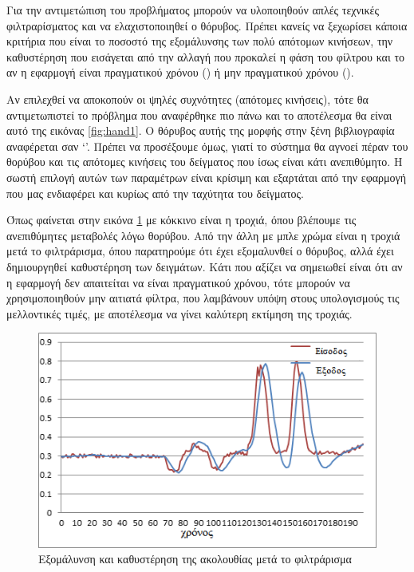 Για την αντιμετώπιση του προβλήματος μπορούν να υλοποιηθούν απλές τεχνικές φιλτραρίσματος και να ελαχιστοποιηθεί ο θόρυβος. Πρέπει κανείς να ξεχωρίσει κάποια κριτήρια που είναι το ποσοστό της εξομάλυνσης των πολύ απότομων κινήσεων, την καθυστέρηση που εισάγεται από την αλλαγή που προκαλεί η φάση του φίλτρου και το αν η εφαρμογή είναι πραγματικού χρόνου () ή μην πραγματικού χρόνου ().

Αν επιλεχθεί να αποκοπούν οι ψηλές συχνότητες (απότομες κινήσεις), τότε θα αντιμετωπιστεί το πρόβλημα που αναφέρθηκε πιο πάνω και το αποτέλεσμα θα είναι αυτό της εικόνας \ref{fig:hand1}. Ο θόρυβος αυτής της μορφής στην ξένη βιβλιογραφία αναφέρεται σαν \lq {}\rq . Πρέπει να προσέξουμε όμως, γιατί το σύστημα θα αγνοεί πέραν του θορύβου και τις απότομες κινήσεις του δείγματος που ίσως είναι κάτι ανεπιθύμητο. Η σωστή επιλογή αυτών των παραμέτρων είναι κρίσιμη και εξαρτάται από την εφαρμογή που μας ενδιαφέρει και κυρίως από την ταχύτητα του δείγματος.

Όπως φαίνεται στην εικόνα \ref{fig:filter-latency} με κόκκινο είναι η τροχιά, όπου βλέπουμε τις ανεπιθύμητες μεταβολές λόγω θορύβου. Από την άλλη με μπλε χρώμα είναι η τροχιά μετά το φιλτράρισμα, όπου παρατηρούμε ότι έχει εξομαλυνθεί ο θόρυβος, αλλά έχει δημιουργηθεί καθυστέρηση των δειγμάτων. Κάτι που αξίζει να σημειωθεί είναι ότι αν η εφαρμογή δεν απαιτείται να είναι πραγματικού χρόνου, τότε μπορούν να χρησιμοποιηθούν μην αιτιατά φίλτρα, που λαμβάνουν υπόψη στους υπολογισμούς τις μελλοντικές τιμές, με αποτέλεσμα να γίνει καλύτερη εκτίμηση της τροχιάς.

\begin{figure}[h]
    \centering
    \includegraphics[width=.8\textwidth]{kinect/fig/filter-latency.png}
    \caption{Εξομάλυνση και καθυστέρηση της ακολουθίας μετά το φιλτράρισμα\protect\footnotemark}
    \label{fig:filter-latency}
\end{figure}

